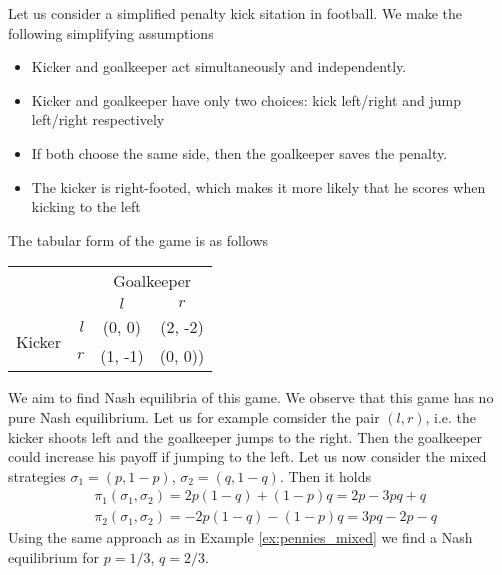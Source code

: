 \begin{example}\label{ex:penalties}
    Let us consider a simplified penalty kick sitation in football. We make the following simplifying assumptions
    \begin{itemize}
        \item Kicker and goalkeeper act simultaneously and independently.
        \item Kicker and goalkeeper have only two choices: kick left/right and jump left/right respectively
        \item If both choose the same side, then the goalkeeper saves the penalty.
        \item The kicker is right-footed, which makes it more likely that he scores when kicking to the left
    \end{itemize}
    The tabular form of the game is as follows
    \begin{center}
        \begin{tabular}{c | r | c | c |}
            \multicolumn{2}{c}{} & \multicolumn{2}{c}{Goalkeeper}\\
            \cline{2-4}
            & & $l$ & $r$ \\
            \cline{2-4}
            \multirow{2}{*}{Kicker} & $l$ & (0, 0) & (2, -2) \\
            \cline{2-4}
            & $r$ & (1, -1) & (0, 0)) \\
            \cline{2-4}
        \end{tabular}            
    \end{center}
    We aim to find Nash equilibria of this game. We observe that this game has no pure Nash equilibrium. Let us for example comsider the pair $(l, r)$, i.e.
    the kicker shoots left and the goalkeeper jumps to the right. Then the goalkeeper could increase his payoff if jumping to the left.
    Let us now consider the mixed strategies $\sigma_{1} = (p, 1 - p)$, $\sigma_{2} = (q, 1 - q)$. Then it holds
    \begin{align*}
        &\pi_{1}(\sigma_{1}, \sigma_{2}) = 2p (1 - q) + (1 - p) q = 2p - 3pq + q\\
        &\pi_{2}(\sigma_{1}, \sigma_{2}) = -2p (1 - q) - (1 - p) q = 3pq - 2p - q
    \end{align*}
    Using the same approach as in Example \ref{ex:pennies_mixed} we find a Nash equilibrium for $p = 1 / 3$, $q = 2 / 3$.
\end{example}

        
